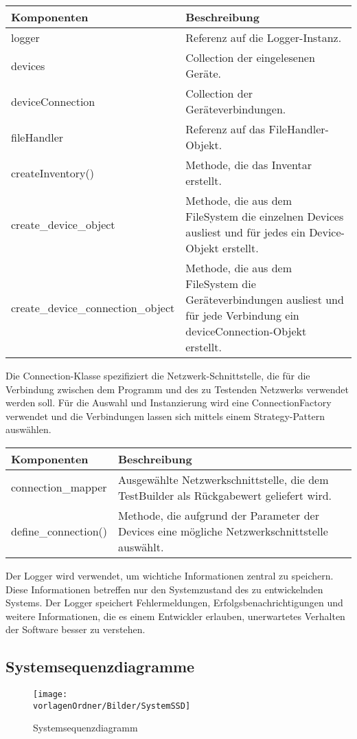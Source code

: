 \documentclass[]{subfiles}
\begin{document}
	\begin{tabularx}{\textwidth}{lX}
		\toprule
			Komponenten & Beschreibung \\
		\midrule
			logger & Referenz auf die Logger-Instanz. \\
			devices & Collection der eingelesenen Geräte.\\
			deviceConnection & Collection der Geräteverbindungen. \\
			fileHandler & Referenz auf das FileHandler-Objekt.\\
		\midrule
			createInventory() & Methode, die das Inventar erstellt. \\
			create\_device\_object & Methode, die aus dem FileSystem die einzelnen Devices ausliest und für jedes ein Device-Objekt erstellt. \\
			create\_device\_connection\_object & Methode, die aus dem FileSystem die Geräteverbindungen ausliest und für jede Verbindung ein deviceConnection-Objekt erstellt.\\
		\bottomrule
	\end{tabularx}
	\newpage

	Die Connection-Klasse spezifiziert die Netzwerk-Schnittstelle, die für die Verbindung zwischen dem Programm und des zu Testenden Netzwerks verwendet werden soll.
	Für die Auswahl und Instanzierung wird eine ConnectionFactory verwendet und die Verbindungen lassen sich mittels einem Strategy-Pattern auswählen.

	\begin{tabularx}{\textwidth}{lX}
		\toprule
			Komponenten & Beschreibung \\
		\midrule
			connection\_mapper & Ausgewählte Netzwerkschnittstelle, die dem TestBuilder als Rückgabewert geliefert wird. \\
		\midrule
			define\_connection() & Methode, die aufgrund der Parameter der Devices eine mögliche Netzwerkschnittstelle auswählt.\\
		\bottomrule
	\end{tabularx}

	Der Logger wird verwendet, um wichtiche Informationen zentral zu speichern. 
	Diese Informationen betreffen nur den Systemzustand des zu entwickelnden Systems.
	Der Logger speichert Fehlermeldungen, Erfolgsbenachrichtigungen und weitere Informationen, die es einem Entwickler erlauben, unerwartetes Verhalten der Software besser zu verstehen.

\begin{landscape}
	\subsection{Systemsequenzdiagramme}
	\begin{figure}[h!]
		\texttt{[image: \\vorlagenOrdner/Bilder/SystemSSD]}
		\caption{Systemsequenzdiagramm}
	\end{figure}
		\newpage
\end{landscape}
	
\end{document}
